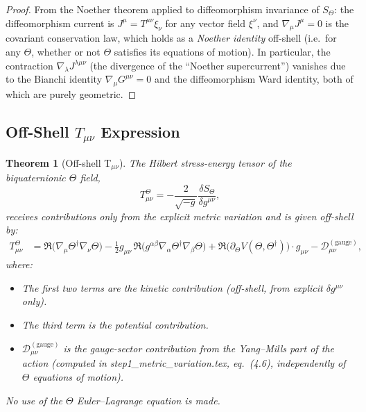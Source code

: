 \documentclass[12pt]{article}
\newtheorem{theorem}{Theorem}[section]
\theoremstyle{definition}
\theoremstyle{remark}
\begin{document}
\begin{proof}
From the Noether theorem applied to diffeomorphism invariance of $S_\Theta$:
the diffeomorphism current is $J^{\mu} = T^{\mu\nu}\xi_\nu$ for any vector field $\xi^\nu$,
and $\nabla_\mu J^\mu = 0$ is the covariant conservation law, which holds as a
\emph{Noether identity} off-shell (i.e.\ for any $\Theta$, whether or not
$\Theta$ satisfies its equations of motion).  In particular, the contraction
$\nabla_\lambda J^{\lambda\mu\nu}$ (the divergence of the ``Noether supercurrent'')
vanishes due to the Bianchi identity $\nabla_\mu G^{\mu\nu}=0$ and the
diffeomorphism Ward identity, both of which are purely geometric.
\end{proof}

\subsection{Off-Shell $T_{\mu\nu}$ Expression}

\begin{theorem}[Off-shell T$_{\mu\nu}$]
\label{thm:offshell_Tmunu}
The Hilbert stress-energy tensor of the biquaternionic $\Theta$ field,
\begin{equation}
  T_{\mu\nu}^{\Theta}
  = -\frac{2}{\sqrt{-g}}\frac{\delta S_\Theta}{\delta g^{\mu\nu}},
  \label{eq:T_hilbert_offshell}
\end{equation}
receives contributions only from the explicit metric variation and is given
\emph{off-shell} by:
\begin{align}
  T_{\mu\nu}^{\Theta}
  &= \Re\!\bigl(\nabla_\mu\Theta^\dagger\nabla_\nu\Theta\bigr)
   - \tfrac{1}{2}g_{\mu\nu}\,\Re\!\bigl(g^{\alpha\beta}\nabla_\alpha\Theta^\dagger\nabla_\beta\Theta\bigr)
   + \Re\!\bigl(\partial_\Theta V(\Theta,\Theta^\dagger)\bigr)\cdot g_{\mu\nu}
   - \mathcal{D}_{\mu\nu}^{(\text{gauge})},
  \label{eq:T_offshell}
\end{align}
where:
\begin{itemize}
  \item The first two terms are the kinetic contribution (off-shell, from explicit
        $\delta g^{\mu\nu}$ only).
  \item The third term is the potential contribution.
  \item $\mathcal{D}_{\mu\nu}^{(\text{gauge})}$ is the gauge-sector contribution
        from the Yang--Mills part of the action (computed in step1\_metric\_variation.tex,
        eq.~(4.6), independently of $\Theta$ equations of motion).
\end{itemize}
No use of the $\Theta$ Euler--Lagrange equation is made.
\end{theorem}
\end{document}
